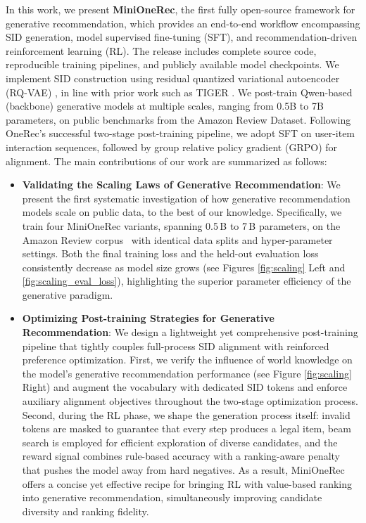 In this work, we present \textbf{MiniOneRec}, the first fully open-source framework for generative recommendation, which provides an end-to-end workflow encompassing SID generation, model supervised fine-tuning (SFT), and recommendation-driven reinforcement learning (RL). The release includes complete source code, reproducible training pipelines, and publicly available model checkpoints.
We implement SID construction using residual quantized variational autoencoder (RQ-VAE) \citep{rqvae}, in line with prior work such as TIGER \citep{TIGER, OneRec}.
We post-train Qwen-based (backbone) generative models at multiple scales, ranging from 0.5B to 7B parameters, on public benchmarks from the Amazon Review Dataset.
Following OneRec's successful two-stage post-training pipeline, we adopt SFT on user-item interaction sequences, followed by group relative policy gradient (GRPO) \citep{Deepseek-r1, deepseekmath} for alignment.
The main contributions of our work are summarized as follows:
\begin{itemize}
    \item \textbf{Validating the Scaling Laws of Generative Recommendation}:
    We present the first systematic investigation of how generative recommendation models scale on public data, to the best of our knowledge. Specifically, we train four MiniOneRec variants, spanning 0.5\,B to 7\,B parameters, on the Amazon Review corpus~\citep{amazon} with identical data splits and hyper-parameter settings. Both the final training loss and the held-out evaluation loss consistently decrease as model size grows (see Figures \ref{fig:scaling} Left and \ref{fig:scaling_eval_loss}), highlighting the superior parameter efficiency of the generative paradigm.
    \item \textbf{Optimizing Post-training Strategies for Generative Recommendation}: 
    We design a lightweight yet comprehensive post-training pipeline that tightly couples full-process SID alignment with reinforced preference optimization. First, we verify the influence of world knowledge on the model’s generative recommendation performance (see Figure \ref{fig:scaling} Right) and augment the vocabulary with dedicated SID tokens and enforce auxiliary alignment objectives throughout the two-stage optimization process. Second, during the RL phase, we shape the generation process itself: invalid tokens are masked to guarantee that every step produces a legal item, beam search is employed for efficient exploration of diverse candidates, and the reward signal combines rule-based accuracy with a ranking-aware penalty that pushes the model away from hard negatives. As a result, MiniOneRec offers a concise yet effective recipe for bringing RL with value-based ranking into generative recommendation, simultaneously improving candidate diversity and ranking fidelity.
\end{itemize}

